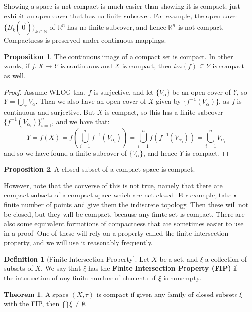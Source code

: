 \documentclass[11pt, oneside]{amsart}   	%
\theoremstyle{definition}
\newtheorem{definition}{Definition}[section]
\newtheorem{theorem}{Theorem}[section]
\newtheorem{prop}{Proposition}[section]
\begin{document}
	Showing a space is not compact is much easier than showing it is compact; just exhibit an open cover that has no finite 
	subcover. For example, the open cover $\{B_k(\vec{0})\}_{k\in\mathbb N}$ of $\mathbb R^n$ has no finite subcover, and 
	hence $\mathbb R^n$ is not compact. Compactness is preserved under continuous mappings.
	
	\begin{prop}
		The continuous image of a compact set is compact. In other words, if $f : X\rightarrow Y$ is continuous and $X$ is 
		compact, then $im(f)\subseteq Y$ is compact as well.
	\end{prop}
	
	\begin{proof}
		Assume WLOG that $f$ is surjective, and let $\{V_\alpha\}$ be an open cover of $Y$, so $Y = \bigcup_\alpha V_
		\alpha$. Then we also have an open cover of $X$ given by $\{f^{-1}(V_\alpha)\}$, as $f$ is continuous and 
		surjective. But $X$ is compact, so this has a finite subcover $\{f^{-1}(V_{\alpha_i})\}_{i = 1}^n$, and we have that:
		$$
			Y = f(X) = f(\bigcup_{i = 1}^n f^{-1}(V_{\alpha_i})) = \bigcup_{i = 1}^n f(f^{-1}(V_{\alpha_i})) = \bigcup_{i = 1}^n 
			V_{\alpha_i}
		$$
		and so we have found a finite subcover of $\{V_\alpha\}$, and hence $Y$ is compact.
	\end{proof}
	
	\begin{prop}
		A closed subset of a compact space is compact.
	\end{prop}
	
	However, note that the converse of this is not true, namely that there are compact subsets of a compact space which 
	are not closed. For example, take a finite number of points and give them the indiscrete topology. Then these will 
	not be closed, but they will be compact, because any finite set is compact. There are also some equivalent formations of 
	compactness that are sometimes easier to use in a proof. One of these will rely on a property called the finite intersection 
	property, and we will use it reasonably frequently.
	
	\begin{definition}[Finite Intersection Property]
		Let $X$ be a set, and $\xi$ a collection of subsets of $X$. We say that $\xi$ has the \textbf{Finite Intersection 
		Property (FIP)} if the intersection of any finite number of elements of $\xi$ is nonempty.
	\end{definition}
	
	\begin{theorem}
		A space $(X, \tau)$ is compact if given any family of closed subsets $\xi$ with the FIP, then $\bigcap\xi\neq
		\emptyset$.
	\end{theorem}
	
\end{document}
